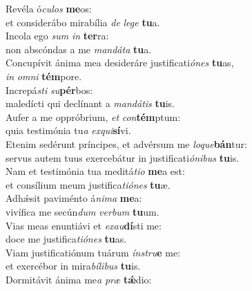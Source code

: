\evenverse Revéla ó\textit{cu}\textit{los} \textbf{me}os:~\*\\
\evenverse et considerábo mirabília \textit{de} \textit{le}\textit{ge} \textbf{tu}a.\\
\oddverse Incola ego \textit{sum} \textit{in} \textbf{ter}ra:~\*\\
\oddverse non abscóndas a me \textit{man}\textit{dá}\textit{ta} \textbf{tu}a.\\
\evenverse Concupívit ánima mea desideráre justificati\textit{ó}\textit{nes} \textbf{tu}as,~\*\\
\evenverse \textit{in} \textit{om}\textit{ni} \textbf{tém}pore.\\
\oddverse Increpá\textit{sti} \textit{su}\textbf{pér}bos:~\*\\
\oddverse maledícti qui declínant a \textit{man}\textit{dá}\textit{tis} \textbf{tu}is.\\
\evenverse Aufer a me oppróbrium, \textit{et} \textit{con}\textbf{tém}ptum:~\*\\
\evenverse quia testimónia tu\textit{a} \textit{ex}\textit{qui}\textbf{sí}vi.\\
\oddverse Etenim sedérunt príncipes, et advérsum me \textit{lo}\textit{que}\textbf{bán}tur:~\*\\
\oddverse servus autem tuus exercebátur in justificati\textit{ó}\textit{ni}\textit{bus} \textbf{tu}is.\\
\evenverse Nam et testimónia tua meditá\textit{ti}\textit{o} \textbf{me}a est:~\*\\
\evenverse et consílium meum justifica\textit{ti}\textit{ó}\textit{nes} \textbf{tu}æ.\\
\oddverse Adhǽsit paviménto á\textit{ni}\textit{ma} \textbf{me}a:~\*\\
\oddverse vivífica me secún\textit{dum} \textit{ver}\textit{bum} \textbf{tu}um.\\
\evenverse Vias meas enuntiávi et \textit{e}\textit{xau}\textbf{dí}sti me:~\*\\
\evenverse doce me justifica\textit{ti}\textit{ó}\textit{nes} \textbf{tu}as.\\
\oddverse Viam justificatiónum tuárum \textit{ín}\textit{stru}\textbf{e} me:~\*\\
\oddverse et exercébor in mira\textit{bí}\textit{li}\textit{bus} \textbf{tu}is.\\
\evenverse Dormitávit ánima me\textit{a} \textit{præ} \textbf{tǽ}dio:~\*\\
